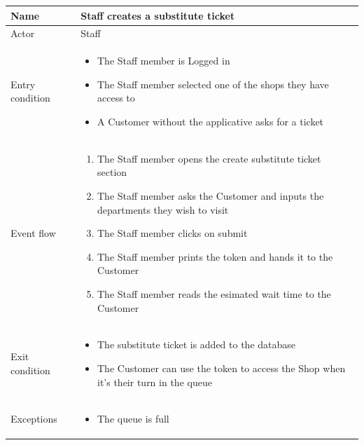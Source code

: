 \begin{table}[H]
    \begin{tabu} to \textwidth {|X|X[4]|}
        \hline
        Name            & Staff creates a substitute ticket \\ \hline
        Actor           & Staff                             \\ \hline
        Entry condition & \begin{itemize}
            \item The Staff member is Logged in
            \item The Staff member selected one of the shops they have access to
            \item A Customer without the applicative asks for a ticket
        \end{itemize}        \\ \hline
        Event flow      & \begin{enumerate}
            \item The Staff member opens the create substitute ticket section
            \item The Staff member asks the Customer and inputs the departments they wish to visit
            \item The Staff member clicks on submit
            \item The Staff member prints the token and hands it to the Customer
            \item The Staff member reads the esimated wait time to the Customer
        \end{enumerate}        \\ \hline
        Exit condition  & \begin{itemize}
            \item The substitute ticket is added to the database
            \item The Customer can use the token to access the Shop when it's their turn in the queue
        \end{itemize}        \\ \hline
        Exceptions      & \begin{itemize}
            \item The queue is full
        \end{itemize}        \\ \hline
    \end{tabu}
\end{table}


